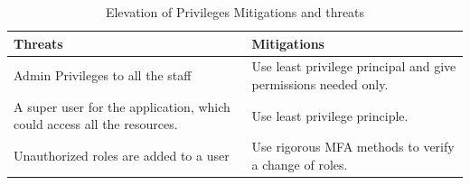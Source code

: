\begingroup
\centering
\setlength{\tabcolsep}{6.5pt} %
\renewcommand{\arraystretch}{1.8} %
\begin{longtable}{ |p{7cm}| p{8cm} |}
\caption{Elevation of Privileges Mitigations and threats}
    \label{table:eop}
\hline
\textbf{Threats} & \textbf{Mitigations} \\
\hline
Admin Privileges to all the staff & Use least privilege principal and give permissions needed only.
\\
\hline
A super user for the application, which could access all the resources. & Use least privilege principle.\\
\hline
Unauthorized roles are added to a user & Use rigorous MFA methods to verify a change of roles.
\hline
\end{longtable}
\endgroup



